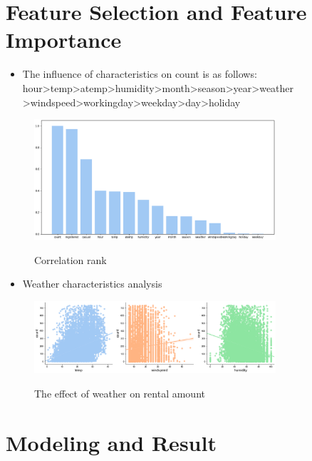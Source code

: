 \section{Feature Selection and Feature Importance} \label{sec-feature}

\begin{itemize}
  \item
  The influence of characteristics on count is as follows:\\
  hour>temp>atemp>humidity>month>season>year>weather\\
  >windspeed>workingday>weekday>day>holiday
  \end{itemize}
  \begin{figure}
  \centering
  \includegraphics[width=0.8\textwidth]{figures//cor_rank.eps}\\
  \caption{Correlation rank} \label{framework}
\end{figure}
\begin{itemize}
  \item
  Weather characteristics analysis
\end{itemize}
  \begin{figure}
  \centering
  \includegraphics[width=0.8\textwidth]{figures//weather.eps}\\
  \caption{The effect of weather on rental amount} \label{framework}
\end{figure}        


\section{Modeling and Result}\label{sec-result}

